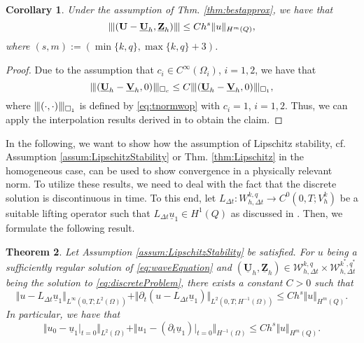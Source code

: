 \documentclass[sn-mathphys-num]{sn-jnl}
\newtheorem{thm}{Theorem}[section]
\newtheorem{cor}[thm]{Corollary}
\numberwithin{equation}{section}
\newcommand{\wop}{\square_c}
\newcommand{\tnorm}[1]{\vert\hspace{-0.3mm}\Vert#1\Vert\hspace{-0.3mm}\vert}
\newcommand{\FullyDiscrSpace}[2]{ W^{ {#1},{#2}}_{h, \Delta t  } }
\newcommand{\ProdFullyDiscrSpace}[2]{ \mathcal{W}^{ {#1},{#2}}_{h, \Delta t  } }
\newcommand{\Uh}{\underline{\mathbf{U}}_h}
\newcommand{\Vh}{\underline{\mathbf{V}}_h}
\newcommand{\Zh}{\underline{\mathbf{Z}}_h}
\newcommand{\ul}{\underline{u}}
\newcommand{\dt}{\partial_t}
\begin{document}
\begin{cor}\label{cor:tnormConvRates}
    Under the assumption of Thm. \ref{thm:bestapprox}, we have that
    \begin{equation*}
        \tnorm{(\mathbf{U} - \Uh,\Zh)} \le C h^s \Vert u \Vert_{H^m(Q)},
    \end{equation*}
    where $(s,m) := (\min\{ k,q \}, \max\{k,q\}+3)$. 
\end{cor}

\begin{proof}
    Due to the assumption that $c_i \in C^\infty(\Omega_i)$, $i = 1,2$, we have that 
    \begin{equation*}
        \tnorm{(\Uh - \Vh, 0)}_{\wop} \le C \tnorm{(\Uh - \Vh, 0)}_{\square_1},
    \end{equation*}
    where $\tnorm{(\cdot, \cdot)}_{\square_1}$ is defined by \eqref{eq:tnormwop} with $c_i = 1$, $i = 1,2$. Thus, we can apply the interpolation results derived in \cite[Lem. 2.4]{BP24} to obtain the claim. 
\end{proof}


\noindent In the following, we want to show how the assumption of Lipschitz stability, cf. Assumption \ref{assum:LipschitzStability} or Thm. \ref{thm:Lipschitz} in the homogeneous case, can be used to show convergence in a physically relevant norm. To utilize these results, we need to deal with the fact that the discrete solution is discontinuous in time. To this end, let $L_{\Delta t} : \FullyDiscrSpace{k}{q} \rightarrow C^0(0,T;V_h^k)$ be a suitable lifting operator such that $L_{\Delta t} \ul_1 \in H^1(Q)$ as discussed in \cite[Sec. 4]{BP24}. Then, we formulate the following result.

\begin{thm}\label{thm:convergence}
    Let Assumption \ref{assum:LipschitzStability} be satisfied. For $u$ being a sufficiently regular solution of \eqref{eq:waveEquation} and $(\Uh,\Zh) \in \ProdFullyDiscrSpace{k}{q} \times \ProdFullyDiscrSpace{k^\ast}{q^\ast}$ being the solution to \eqref{eq:discreteProblem}, there exists a constant $C>0$ such that
    \begin{equation}
        \Vert u - L_{\Delta t} \ul_1 \Vert_{L^\infty(0,T;L^2(\Omega))} + \Vert \dt (u - L_{\Delta t} \ul_1) \Vert_{L^2(0,T;H^{-1}(\Omega))} \le C h^s \Vert u \Vert_{H^m(Q)}. 
    \end{equation}
    In particular, we have that 
    \begin{equation}
        \Vert u_0 - \ul_1 \vert_{t = 0} \Vert_{L^2(\Omega)} + \Vert u_1 - (\dt \ul_1) \vert_{t = 0} \Vert_{H^{-1}(\Omega)} \le C h^s \Vert u \Vert_{H^m(Q)}.
    \end{equation}
\end{thm}
\end{document}
